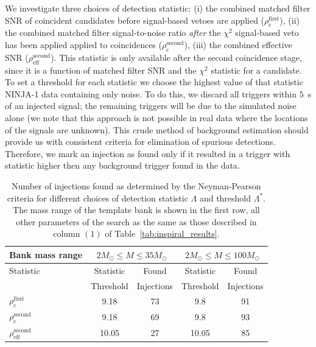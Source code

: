 We investigate three choices of detection statistic: (i) the combined
matched filter SNR of coincident candidates before signal-based vetoes
are applied ($\rho_\mathrm{c}^\mathrm{first}$), (ii) the combined
matched filter signal-to-noise ratio \emph{after} the $\chi^2$
signal-based veto has been applied applied to coincidences
($\rho_\mathrm{c}^\mathrm{second}$), (iii) the combined effective SNR
($\rho_\mathrm{eff}^{\mathrm{second}}$). This statistic is only
available after the second coincidence stage, since it is a function
of matched filter SNR and the $\chi^2$ statistic for a candidate.  To
set a threshold for each statistic we choose the highest value of that
statistic NINJA-1 data containing only noise.  To do this, we discard
all triggers within $5$~s of an injected signal; the remaining
triggers will be due to the simulated noise alone (we note that this
approach is not possible in real data where the locations of the
signals are unknown). This crude method of background estimation
should provide us with consistent criteria for elimination of spurious
detections. Therefore, we mark an injection as found only if it
resulted in a trigger with statistic higher then any background
trigger found in the data.  

\begin{table}
\begin{center}
\begin{tabular}{|l|c|c|c|c|}
\hline
Bank mass range& \multicolumn{2}{c|}{$2M_\odot\le M\le 35 M_\odot$} & \multicolumn{2}{c|}{$2M_\odot\le M\le 100 M_\odot$} \\
\hline 
Statistic & Statistic  & Found & 
Statistic & Found \\
 & Threshold& Injections& 
Threshold& Injections \\
\hline
$\rho_\mathrm{c}^\mathrm{first}$  & 9.18 & 73  & 9.8 & 91 \\
$\rho_\mathrm{c}^\mathrm{second}$ & 9.18  & 69 & 9.8 & 93\\
$\rho_\mathrm{eff}^\mathrm{second}$  & 10.05 & 27  & 10.05 & 85 \\
 \hline
\end{tabular}
\end{center}
\caption[NINJA-1 injections found in the LIGO/Virgo search]{
\label{tab:threshold_found}
Number of injections found as determined by the Neyman-Pearson
criteria for different choices of detection statistic $\Lambda$ and
threshold $\Lambda^\ast$. The mass range of the template bank is shown in the
first row, all other parameters of the search as the same as those described
in column $(1)$ of Table~\ref{tab:inspiral_results}.}
\end{table}

